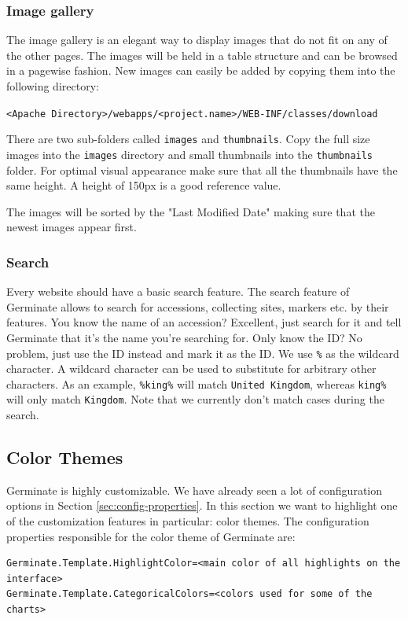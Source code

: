 \subsubsection{Image gallery}
The image gallery is an elegant way to display images that do not fit on any of the other pages. The images will be held in a table structure and can be browsed in a pagewise fashion. New images can easily be added by copying them into the following directory:
\begin{center}
    \texttt{<Apache Directory>/webapps/<project.name>/WEB-INF/classes/download}
\end{center}
There are two sub-folders called \texttt{images} and \texttt{thumbnails}. Copy the full size images into the \texttt{images} directory and small thumbnails into the \texttt{thumbnails} folder. For optimal visual appearance make sure that all the thumbnails have the same height. A height of 150px is a good reference value.

The images will be sorted by the "Last Modified Date" making sure that the newest images appear first.

\subsubsection{Search}
Every website should have a basic search feature. The search feature of Germinate allows to search for accessions, collecting sites, markers etc. by their features. You know the name of an accession? Excellent, just search for it and tell Germinate that it's the name you're searching for. Only know the ID? No problem, just use the ID instead and mark it as the ID. We use \texttt{\%} as the wildcard character. A wildcard character can be used to substitute for arbitrary other characters. As an example, \texttt{\%king\%} will match \texttt{United Kingdom}, whereas \texttt{king\%} will only match \texttt{Kingdom}. Note that we currently don't match cases during the search.

\subsection{Color Themes}
Germinate is highly customizable. We have already seen a lot of configuration options in Section \ref{sec:config-properties}. In this section we want to highlight one of the customization features in particular: color themes. The configuration properties responsible for the color theme of Germinate are:

\begin{lstlisting}[style=Properties]
Germinate.Template.HighlightColor=<main color of all highlights on the interface>
Germinate.Template.CategoricalColors=<colors used for some of the charts>
\end{lstlisting}

